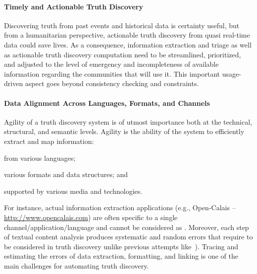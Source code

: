 \documentclass[prodmode,acmtecs]{acmsmall} %
\begin{document}
\paragraph*{Timely and Actionable Truth Discovery} 
Discovering truth from past events and historical data is certainty useful, but
from a humanitarian perspective, actionable truth discovery from quasi real-time data 
could save lives. As a consequence, information extraction and triage as well as actionable
truth discovery computation need to be streamlined, prioritized,  and adjusted to the level 
of emergency and incompleteness of available information regarding the communities that will 
use it. This important usage-driven aspect goes beyond consistency checking and constraints.
%

\paragraph*{Data Alignment Across Languages, Formats, and Channels} 
Agility of a truth discovery system is of utmost importance both at 
the technical, structural, and semantic levels. 
Agility is the ability of the system 
to efficiently extract and map information: 
\begin{inparaenum}[(i)]
\item from various languages;
\item various formats and data structures; and
\item supported by various media and technologies.
\end{inparaenum}
For instance, actual information extraction applications (e.g., Open-Calais -- \url{http://www.opencalais.com})  
are often specific to a single channel/application/language and cannot be considered as . Moreover,
each step of textual content analysis produces systematic and random errors that 
require to be considered in truth discovery unlike previous attempts like~\cite{GoasdoueKKLMZ13}). 
Tracing and estimating  the errors of data extraction, formatting, and linking
is one of the main challenges for automating truth discovery. 
%
\end{document}
